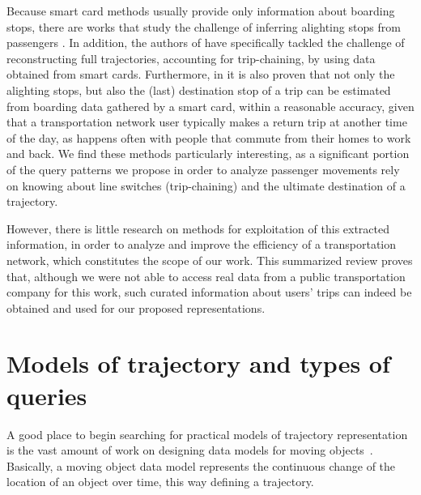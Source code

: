 \documentclass[a4paper,10pt,twoside]{book}
\begin{document}
    Because smart card methods usually provide only information about boarding stops, there are works that study the challenge of inferring alighting stops from passengers \cite{wang2011review}. In addition, the authors of \cite{tao2014exploring} have specifically tackled the challenge of reconstructing full trajectories, accounting for trip-chaining, by using data obtained from smart cards. Furthermore, in \cite{alsger2016validating} it is also proven that not only the alighting stops, but also the (last) destination stop of a trip can be estimated from boarding data gathered by a smart card, within a reasonable accuracy, given that a transportation network user typically makes a return trip at another time of the day, as happens often with people that commute from their homes to work and back. We find these methods particularly interesting, as a significant portion of the query patterns we propose in order to analyze passenger movements rely on knowing about line switches (trip-chaining) and the ultimate destination of a trajectory.
    
    However, there is little research on methods for exploitation of this extracted information, in order to analyze and improve the efficiency of a transportation network, which constitutes the scope of our work. This summarized review proves that, although we were not able to access real data from a public transportation company for this work, such curated information about users' trips can indeed be obtained and used for our proposed representations.
	
	\section{Models of trajectory and types of queries}
    A good place to begin searching for practical models of trajectory representation is the vast amount of work on designing data models for moving objects~\cite{DBLP:conf/ssdbm/WolfsonXCJ98,DBLP:conf/icde/SistlaWCD97,DBLP:journals/tods/GutingBEJLSV00,DBLP:conf/chorochronos/GutingBEJLNSV03,DBLP:journals/geoinformatica/Spaccapietra01,DBLP:conf/sigmod/ForlizziGNS00,DBLP:journals/geoinformatica/ErwigGSV99,DBLP:books/mk/GutingS2005}. Basically, a moving object data model represents the continuous change of the location of an object over time, this way defining a trajectory.
    
\end{document}

